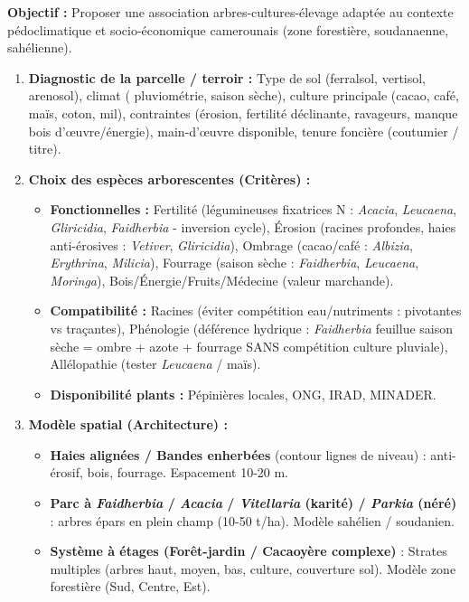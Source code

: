 \documentclass[11pt]{article}
\begin{document}
\begin{methode}
    \textbf{Objectif :} Proposer une association arbres-cultures-élevage adaptée au contexte pédoclimatique et socio-économique camerounais (zone forestière, soudanaenne, sahélienne).
    \begin{enumerate}
        \item \textbf{Diagnostic de la parcelle / terroir :} Type de sol (ferralsol, vertisol, arenosol), climat ( pluviométrie, saison sèche), culture principale (cacao, café, maïs, coton, mil), contraintes (érosion, fertilité déclinante, ravageurs, manque bois d'œuvre/énergie), main-d'œuvre disponible, tenure foncière (coutumier / titre).
        \item \textbf{Choix des espèces arborescentes (Critères) :}
        \begin{itemize}
            \item \textbf{Fonctionnelles :} Fertilité (légumineuses fixatrices N : \emph{Acacia}, \emph{Leucaena}, \emph{Gliricidia}, \emph{Faidherbia} - inversion cycle), Érosion (racines profondes, haies anti-érosives : \emph{Vetiver}, \emph{Gliricidia}), Ombrage (cacao/café : \emph{Albizia}, \emph{Erythrina}, \emph{Milicia}), Fourrage (saison sèche : \emph{Faidherbia}, \emph{Leucaena}, \emph{Moringa}), Bois/Énergie/Fruits/Médecine (valeur marchande).
            \item \textbf{Compatibilité :} Racines (éviter compétition eau/nutriments : pivotantes vs traçantes), Phénologie (déférence hydrique : \emph{Faidherbia} feuillue saison sèche = ombre + azote + fourrage SANS compétition culture pluviale), Allélopathie (tester \emph{Leucaena} / maïs).
            \item \textbf{Disponibilité plants :} Pépinières locales, ONG, IRAD, MINADER.
        \end{itemize}
        \item \textbf{Modèle spatial (Architecture) :}
        \begin{itemize}
            \item \textbf{Haies alignées / Bandes enherbées} (contour lignes de niveau) : anti-érosif, bois, fourrage. Espacement 10-20 m.
            \item \textbf{Parc à \emph{Faidherbia} / \emph{Acacia} / \emph{Vitellaria} (karité) / \emph{Parkia} (néré)} : arbres épars en plein champ (10-50 t/ha). Modèle sahélien / soudanien.
            \item \textbf{Système à étages (Forêt-jardin / Cacaoyère complexe)} : Strates multiples (arbres haut, moyen, bas, culture, couverture sol). Modèle zone forestière (Sud, Centre, Est).

\end{itemize}
\end{enumerate}
\end{methode}
\end{document}
